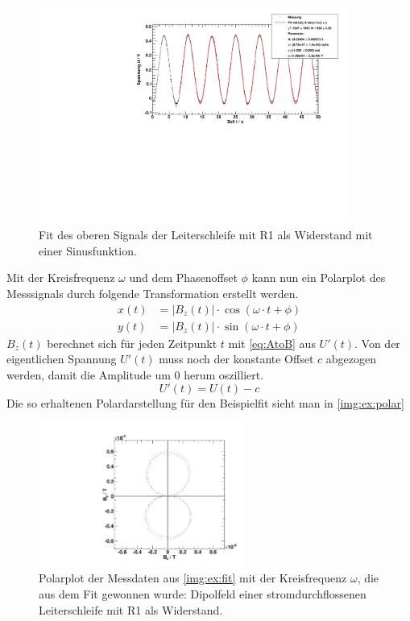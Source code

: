 \begin{figure}[H]
\begin{center}
  \includegraphics[width=0.9\textwidth]{../img/fit_Spule_R1.pdf}
  \caption{Fit des oberen Signals der Leiterschleife mit R1 als Widerstand mit einer Sinusfunktion.}
  \label{img:ex:fit}
\end{center}
\end{figure}

Mit der Kreisfrequenz $\omega$ und dem Phasenoffset $\phi$ kann nun ein Polarplot des Messsignals durch folgende Transformation erstellt werden.
\begin{equation}
  \label{eq:polartransform}
  \begin{split}
    x(t) &= |B_z(t)| \cdot \cos(\omega \cdot t + \phi) \\
    y(t) &= |B_z(t)| \cdot \sin(\omega \cdot t + \phi)
  \end{split}
\end{equation}
$B_z(t)$ berechnet sich für jeden Zeitpunkt $t$ mit \autoref{eq:AtoB} aus $U'(t)$. Von der eigentlichen Spannung $U'(t)$ muss noch der 
konstante Offset $c$ abgezogen werden, damit die Amplitude um 0 herum oszilliert.
\begin{equation}
  U'(t) = U(t) - c
\end{equation}
Die so erhaltenen Polardarstellung für den Beispielfit sieht man in \autoref{img:ex:polar}
\begin{figure}[H]
\begin{center}
  \includegraphics[width=0.6\textwidth]{../img/polar_Spule_R1.pdf}
  \caption{Polarplot der Messdaten aus \autoref{img:ex:fit} mit der Kreisfrequenz $\omega$,
  die aus dem Fit gewonnen wurde: Dipolfeld einer stromdurchflossenen Leiterschleife mit R1 als Widerstand.}
  \label{img:ex:polar}
\end{center}
\end{figure}

